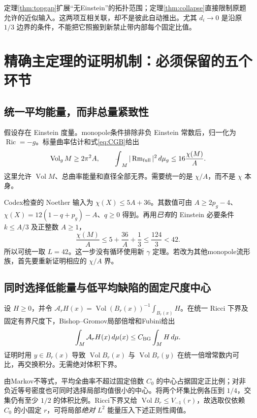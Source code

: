 \documentclass[UTF8,a4paper,11pt,fontset=fandol]{ctexart}
\numberwithin{equation}{section}
\theoremstyle{definition}
\newcommand{\Ric}{\operatorname{Ric}}
\newcommand{\Rm}{\operatorname{Rm}}
\newcommand{\Vol}{\operatorname{Vol}}
\newcommand{\dd}{\,d\mu_g}
\newcommand{\fint}{\mathop{\rlap{\,\raisebox{0.1ex}{\tiny$-$}}\int}\nolimits}
\begin{document}
定理\ref{thm:topgap}扩展“无Einstein”的拓扑范围；定理\ref{thm:collapse}直接限制原题允许的近似输入。这两项互相关联，却不是彼此自动推出。尤其 $d_i\to0$ 是沿原 $1/3$ 边界的条件，不能把它照搬到新禁止带内部每个固定比值。

\section{精确主定理的证明机制：必须保留的五个环节}
\subsection{统一平均能量，而非总量紧致性}
假设存在 Einstein 度量。monopole条件排除非负 Einstein 常数后，归一化为 $\Ric=-g$。标量曲率估计和式\eqref{eq:CGB}给出
\begin{equation}\label{eq:budget}
 \Vol_gM\ge2\pi^2A,
 \qquad \fint_M|\Rm_{\rm full}|^2\dd
 \le16\frac{\chi(M)}A.
\end{equation}
这里允许 $\Vol M$、总曲率能量和直径全部无界。需要统一的是 $\chi/A$，而不是 $\chi$ 本身。

Codex检查的 Noether 输入为 $\chi(X)\le5A+36$。其数值可由 $A\ge2p_g-4$、$\chi(X)=12(1-q+p_g)-A$、$q\ge0$ 得到。再用\emph{已有}的 Einstein 必要条件 $k\le A/3$ 及正整数 $A\ge1$，
\begin{equation}
 \frac{\chi(M)}A\le5+\frac{36}A+\frac13\le\frac{124}3<42.
\end{equation}
所以可统一取 $L=42$。这一步没有循环使用新 $\gamma$ 定理。若改为其他monopole流形族，首先要重新证明相应的 $\chi/A$ 界。

\subsection{同时选择低能量与低平均缺陷的固定尺度中心}
设 $H\ge0$，并令 $\mathcal A_rH(x)=\Vol(B_r(x))^{-1}\int_{B_r(x)}H$。在统一 Ricci 下界及固定有界尺度下，Bishop--Gromov局部倍增和Fubini给出
\begin{equation}\label{eq:fubini}
 \int_M\mathcal A_rH(x)\,d\mu(x)\le C_{\rm BG}\int_MH\,d\mu.
\end{equation}
证明时用 $y\in B_r(x)$ 导致 $\Vol B_r(x)$ 与 $\Vol B_r(y)$ 在统一倍增常数内可比，再交换积分。无需绝对体积下界。

由Markov不等式，平均全曲率不超过固定倍数 $C_0$ 的中心占据固定正比例；对非负近等号密度也可同时选择局部均值很小的中心。将两个坏集比例各压到 $1/4$，交集仍有至少 $1/2$ 的体积比例。Ricci下界又给 $\Vol B_r\le V_{-1}(r)$，故选取仅依赖 $C_0$ 的小固定 $r$，可将局部\emph{绝对} $L^2$ 能量压入下述正则性阈值。
\end{document}

